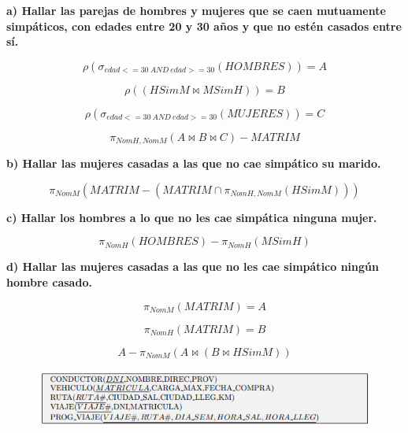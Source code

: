 \documentclass[a4paper,11pt]{article}
\begin{document}
\textbf{a) Hallar las parejas de hombres y mujeres que se caen mutuamente simpáticos,
con edades entre 20 y 30 años y que no estén casados entre sí.}

\begin{equation*}
\rho(\sigma_{edad<=30 \> AND \> edad>=30}(HOMBRES))=A
\end{equation*}

\begin{equation*}
\rho((HSimM \Join MSimH))=B
\end{equation*}

\begin{equation*}
\rho(\sigma_{edad<=30 \> AND \> edad>=30}(MUJERES))=C
\end{equation*}

\begin{equation*}
\pi_{NomH,NomM}(A\Join B\Join C)-MATRIM
\end{equation*}

\textbf{b) Hallar las mujeres casadas a las que no cae simpático su marido.}

\begin{equation*}
\pi_{NomM}(MATRIM-(MATRIM\cap \pi_{NomH,NomM}(HSimM)))
\end{equation*}

\textbf{c) Hallar los hombres a lo que no les cae simpática ninguna mujer.}

\begin{equation*}
\pi_{NomH}(HOMBRES)-\pi_{NomH}(MSimH)
\end{equation*}

\textbf{d) Hallar las mujeres casadas a las que no les cae simpático ningún hombre casado.}

\begin{equation*}
\pi_{NomM}(MATRIM)=A
\end{equation*}

\begin{equation*}
\pi_{NomH}(MATRIM)=B
\end{equation*}

\begin{equation*}
A-\pi_{NomM}(A\Join (B\Join HSimM))
\end{equation*}

\begin{figure}[h]
\centering
\includegraphics[scale=1,width=1\textwidth]{ejer4.png}
\end{figure}
\end{document}
